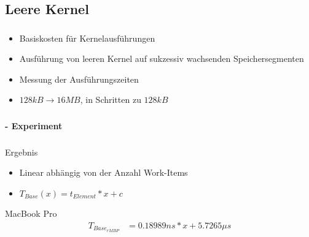 \documentclass{beamer}
\begin{document}
\subsection{Leere Kernel}
\label{sect:model_empty}

\begin{frame}
	\frametitle{}
	\framesubtitle{}
	\begin{itemize}
		\item Basiskosten für Kernelausführungen
		\item Ausführung von leeren Kernel auf sukzessiv wachsenden Speichersegmenten
		\item Messung der Ausführungszeiten
		\item $128kB \rightarrow 16MB$, in Schritten zu $128kB$
	\end{itemize}
\end{frame}

\begin{frame}
	\frametitle{}
	\framesubtitle{ - Experiment}
	\begin{figure}
		\begin{center}
		\end{center}
	\end{figure}
\end{frame}

\begin{frame}
	\frametitle{}
	\framesubtitle{}
	\begin{block}{Ergebnis}
		\begin{itemize}
			\item Linear abhängig von der Anzahl Work-Items
			\item $T_{Base}(x) = t_{Element}*x+c$
		\end{itemize}	
	\end{block}
	\begin{block}{MacBook Pro}
		\begin{align*}
			T_{Base_{rMBP}} &= 0.18989ns * x + 5.7265\mu s
		\end{align*}
	\end{block}
\end{frame}
\end{document}
